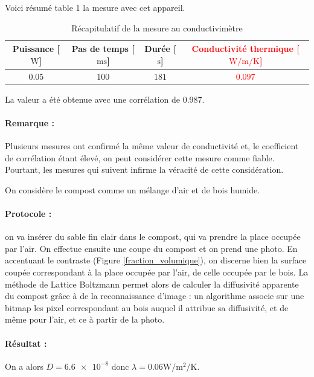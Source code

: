 \documentclass[../PS6_RapportFinal.tex]{subfiles}
\begin{document}
Voici résumé table 1 la mesure avec cet appareil.

\begin{table}[!h]
\begin{center}
\begin{tabular}{|c|c|c|c|}
\hline \textbf{Puissance [$\si{\watt}$]}& \textbf{Pas de temps [$\si{\milli\second}$]} & \textbf{Durée [$\si{\second}$]} & \textcolor{red}{\textbf{Conductivité thermique [$\si{\watt\per\metre\per\kelvin}$]}} \\ 
\hline $\num{0.05}$ & $100$ & $181$ & \textcolor{red}{\textbf{$\num{0.097}$}} \\ 
\hline 
\end{tabular} 
\caption{Récapitulatif de la mesure au conductivimètre}
\label{table_conductivimetre}
\end{center}
\end{table}

La valeur a été obtenue avec une corrélation de \num{0.987}.

\paragraph{Remarque :}
Plusieurs mesures ont confirmé la même valeur de conductivité et, le coefficient de corrélation étant élevé, on peut considérer cette mesure comme fiable.
Pourtant, les mesures qui suivent infirme la véracité de cette considération.


On considère le compost comme un mélange d’air et de bois humide.  

\paragraph{Protocole :}       
on va insérer du sable fin clair dans le compost, qui va prendre la place occupée par l'air. On effectue ensuite une coupe du compost et on prend une photo. En accentuant le contraste (Figure \ref{fraction_volumique}), on discerne bien la surface coupée correspondant à la place occupée par l'air, de celle occupée par le bois. La méthode de Lattice Boltzmann permet alors de calculer la diffusivité apparente du compost grâce à de la reconnaissance d'image : un algorithme associe sur une bitmap les pixel correspondant au bois auquel il attribue sa diffusivité, et de même pour l'air, et ce à partir de la photo.

\paragraph{Résultat :}
On a alors  \(D = \num{6.6e-8}\si{}\) donc \(\lambda = \num{0.06}\si{\watt\per\square\metre\per\kelvin}\).
 
\end{document}
